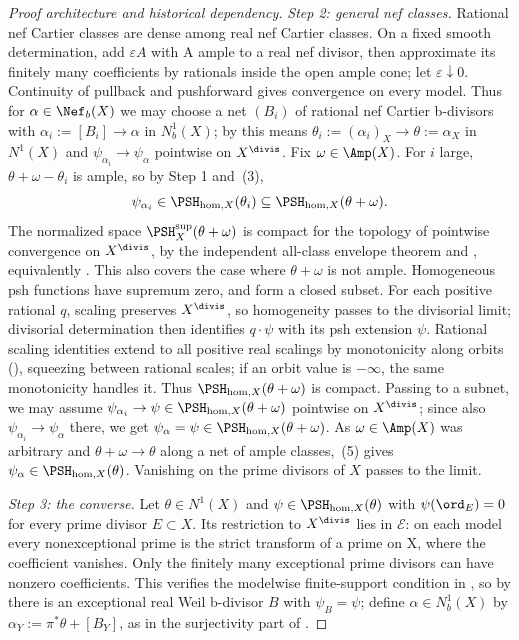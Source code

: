 \begin{proof}[Proof architecture and historical dependency]
\medskip
\noindent\emph{Step 2: general nef classes.}
Rational nef Cartier classes are dense among real nef Cartier classes.
On a fixed smooth determination, add $\varepsilon A$ with A ample to a
real nef divisor, then approximate its finitely many coefficients by
rationals inside the open ample cone; let $\varepsilon\downarrow0$.
Continuity of pullback and pushforward gives convergence on every model.
Thus for $\alpha\in\Nef_b(X)$ we may choose a net $(B_i)$ of rational
nef Cartier b-divisors with $\alpha_i:=[B_i]\to\alpha$ in $N^1_b(X)$; by
 this means
$\theta_i:=(\alpha_i)_X\to\theta:=\alpha_X$ in $N^1(X)$ and
$\psi_{\alpha_i}\to\psi_\alpha$ pointwise on $X^{\divis}$.  Fix
$\omega\in\Amp(X)$.  For $i$ large, $\theta+\omega-\theta_i$ is ample,
so by Step 1 and \,(3),
\[
 \psi_{\alpha_i}\in\PSH_{\mathrm{hom},X}(\theta_i)
 \subseteq\PSH_{\mathrm{hom},X}(\theta+\omega).
\]
The normalized space $\PSH_X^{\sup}(\theta+\omega)$ is compact for the
topology of pointwise convergence on $X^{\divis}$, by the independent
all-class envelope theorem \cite[Theorem~A]{BJ22b} and
\cite[Theorem~5.11\,(ii)]{BJ22}, equivalently
. This also covers the case where
$\theta+\omega$ is not ample. Homogeneous psh functions have supremum
zero, and form a closed subset. For each positive rational $q$, scaling
preserves $X^{\divis}$, so homogeneity passes to the divisorial limit;
divisorial determination then identifies $q\cdot\psi$ with its psh
extension $\psi$. Rational scaling identities extend to all positive
real scalings by monotonicity along orbits
(), squeezing between rational scales;
if an orbit value is $-\infty$, the same monotonicity handles it.
Thus $\PSH_{\mathrm{hom},X}(\theta+\omega)$ is
compact. Passing to a subnet, we may assume
$\psi_{\alpha_i}\to\psi\in\PSH_{\mathrm{hom},X}(\theta+\omega)$
pointwise on $X^{\divis}$; since also
$\psi_{\alpha_i}\to\psi_\alpha$ there, we get
$\psi_\alpha=\psi\in\PSH_{\mathrm{hom},X}(\theta+\omega)$.  As
$\omega\in\Amp(X)$ was arbitrary and
$\theta+\omega\to\theta$ along a net of ample classes,
\,(5) gives
$\psi_\alpha\in\PSH_{\mathrm{hom},X}(\theta)$.  Vanishing on the prime
divisors of $X$ passes to the limit.

\medskip
\noindent\emph{Step 3: the converse.}
Let $\theta\in N^1(X)$ and $\psi\in\PSH_{\mathrm{hom},X}(\theta)$ with
$\psi(\ord_E)=0$ for every prime divisor $E\subset X$.  Its restriction
to $X^{\divis}$ lies in $\mathcal E$: on each model every nonexceptional
prime is the strict transform of a prime on X, where the coefficient
vanishes. Only the finitely many exceptional prime divisors can have
nonzero coefficients. This verifies the modelwise finite-support condition
in , so by
 there is an exceptional real
Weil b-divisor $B$ with $\psi_B=\psi$; define
$\alpha\in N^1_b(X)$ by $\alpha_Y:=\pi^*\theta+[B_Y]$, as in the
surjectivity part of .


\end{proof}
